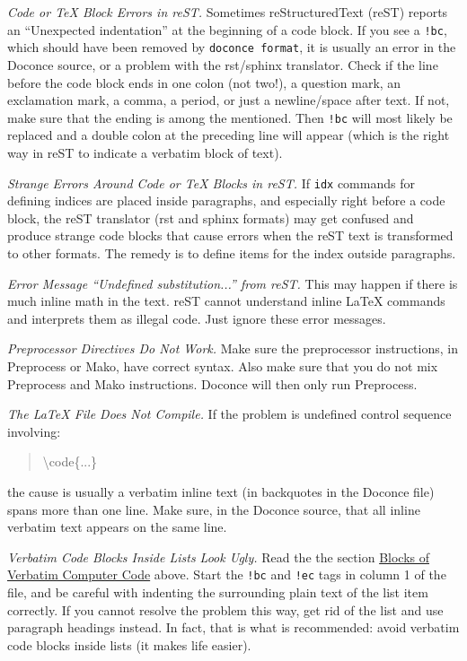 \documentclass[a4paper,english]{article}
\begin{document}
\emph{Code or TeX Block Errors in reST.} Sometimes reStructuredText (reST) reports an ``Unexpected indentation''
at the beginning of a code block. If you see a \texttt{!bc}, which should
have been removed by \texttt{doconce format}, it is usually an error in the
Doconce source, or a problem with the rst/sphinx translator.  Check if
the line before the code block ends in one colon (not two!), a
question mark, an exclamation mark, a comma, a period, or just a
newline/space after text. If not, make sure that the ending is among
the mentioned. Then \texttt{!bc} will most likely be replaced and a double
colon at the preceding line will appear (which is the right way in
reST to indicate a verbatim block of text).

\emph{Strange Errors Around Code or TeX Blocks in reST.} If \texttt{idx} commands for defining indices are placed inside paragraphs,
and especially right before a code block, the reST translator
(rst and sphinx formats) may get confused and produce strange
code blocks that cause errors when the reST text is transformed to
other formats. The remedy is to define items for the index outside
paragraphs.

\emph{Error Message ``Undefined substitution...'' from reST.} This may happen if there is much inline math in the text. reST cannot
understand inline LaTeX commands and interprets them as illegal code.
Just ignore these error messages.

\emph{Preprocessor Directives Do Not Work.} Make sure the preprocessor instructions, in Preprocess or Mako, have
correct syntax. Also make sure that you do not mix Preprocess and Mako
instructions. Doconce will then only run Preprocess.

\emph{The LaTeX File Does Not Compile.} If the problem is undefined control sequence involving:
%
\begin{quote}{\ttfamily \raggedright \noindent
\textbackslash{}code\{...\}
}
\end{quote}

the cause is usually a verbatim inline text (in backquotes in the
Doconce file) spans more than one line. Make sure, in the Doconce source,
that all inline verbatim text appears on the same line.

\emph{Verbatim Code Blocks Inside Lists Look Ugly.} Read the the section \hyperref[blocks-of-verbatim-computer-code]{Blocks of Verbatim Computer Code} above.  Start the
\texttt{!bc} and \texttt{!ec} tags in column 1 of the file, and be careful with
indenting the surrounding plain text of the list item correctly. If
you cannot resolve the problem this way, get rid of the list and use
paragraph headings instead. In fact, that is what is recommended:
avoid verbatim code blocks inside lists (it makes life easier).
\end{document}
